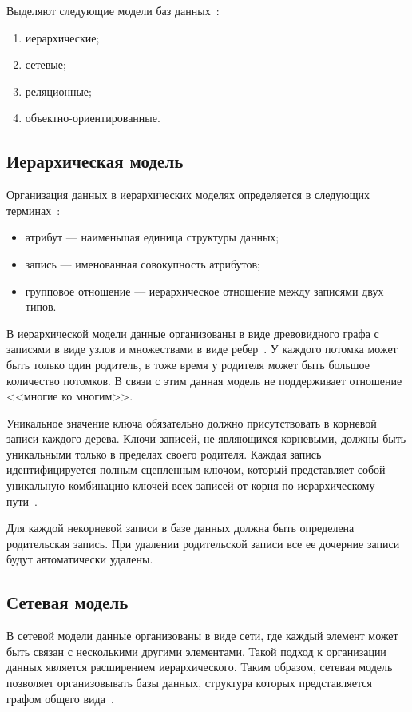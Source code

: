 Выделяют следующие модели баз данных~\cite{db-models}:
\begin{enumerate}
    \item иерархические;
    \item сетевые;
    \item реляционные;
    \item объектно-ориентированные.
\end{enumerate}

\subsection{Иерархическая модель}

Организация данных в иерархических моделях определяется в следующих терминах~\cite{hierarchical}:
\begin{itemize}[label=---]
    \item атрибут --- наименьшая единица структуры данных;
    \item запись --- именованная совокупность атрибутов;
    \item групповое отношение --- иерархическое отношение между записями двух типов.
\end{itemize}

В иерархической модели данные организованы в виде древовидного графа с записями в виде узлов и множествами в виде ребер~\cite{db-models}.
У каждого потомка может быть только один родитель, в тоже время у родителя может быть большое количество потомков.
В связи с этим данная модель не поддерживает отношение <<многие ко многим>>. 

Уникальное значение ключа обязательно должно присутствовать в корневой записи каждого дерева. 
Ключи записей, не являющихся корневыми, должны быть уникальными только в пределах своего родителя. 
Каждая запись идентифицируется полным сцепленным ключом, который представляет собой уникальную комбинацию ключей всех записей от корня по иерархическому пути~\cite{hierarchical}.

Для каждой некорневой записи в базе данных должна быть определена родительская запись. 
При удалении родительской записи все ее дочерние записи будут автоматически удалены.

\subsection{Сетевая модель}

В сетевой модели данные организованы в виде сети, где каждый элемент может быть связан с несколькими другими элементами.
Такой подход к организации данных является расширением иерархического.
Таким образом, сетевая модель позволяет организовывать базы данных, структура которых представляется графом общего вида~\cite{model-def}.

